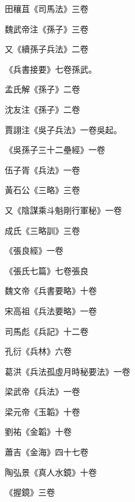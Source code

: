 \begin{pinyinscope}
 田穰苴《司馬法》三卷



 魏武帝注《孫子》三卷



 又《續孫子兵法》二卷



 《兵書接要》七卷孫武。



 孟氏解《孫子》二卷



 沈友注《孫子》二卷



 賈詡注《吳子兵法》一卷吳起。



 《吳孫子三十二壘經》一卷



 伍子胥《兵法》一卷



 黃石公《三略》三卷



 又《陰謀乘斗魁剛行軍秘》一卷



 成氏《三略訓》三卷



 《張良經》一卷



 《張氏七篇》七卷張良



 魏文帝《兵書要略》十卷



 宋高祖《兵法要略》一卷



 司馬彪《兵記》十二卷



 孔衍《兵林》六卷



 葛洪《兵法孤虛月時秘要法》一卷



 梁武帝《兵法》一卷



 梁元帝《玉韜》十卷



 劉祐《金韜》十卷



 蕭吉《金海》四十七卷



 陶弘景《真人水鏡》十卷



 《握鏡》三卷




\end{pinyinscope}
